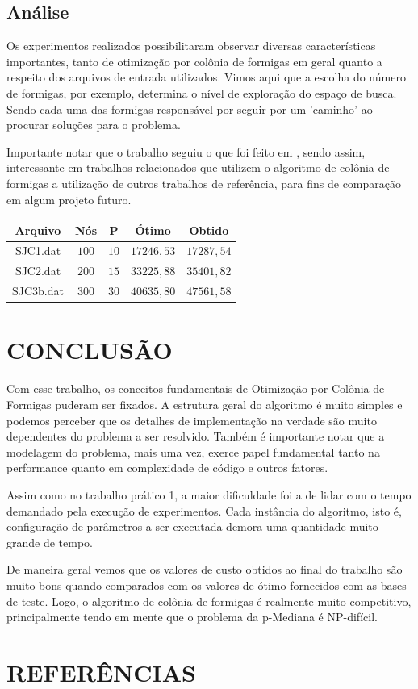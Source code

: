 \documentclass[12pt]{article}
\begin{document}
\subsection{Análise}

Os experimentos realizados possibilitaram observar diversas características importantes, tanto
de otimização por colônia de formigas em geral quanto a respeito dos arquivos de entrada utilizados.
Vimos aqui que a escolha do número de formigas, por exemplo, determina o nível de exploração
do espaço de busca. Sendo cada uma das formigas responsável por seguir por um 'caminho' ao procurar
soluções para o problema.

Importante notar que o trabalho seguiu o que foi feito em \cite{dblp:fr},
sendo assim, interessante em trabalhos relacionados que utilizem o algoritmo de colônia de formigas a
utilização de outros trabalhos de referência, para fins de comparação em algum projeto futuro.

\begin{center}
 \begin{tabular}{|c|c|c|c|c|} \hline
 Arquivo & Nós & P & Ótimo & Obtido \\ \hline
 SJC1.dat & $ 100 $ & $ 10 $ & $ 17246,53 $ & $ 17287,54 $ \\ \hline
 SJC2.dat & $ 200 $ & $ 15 $ & $ 33225,88 $ & $ 35401,82 $ \\ \hline
 SJC3b.dat & $ 300 $ & $ 30 $ & $ 40635,80 $ & $ 47561,58 $ \\ \hline
 \end{tabular} 
\end{center}

\section{CONCLUSÃO}

Com esse trabalho, os conceitos fundamentais de Otimização por Colônia de Formigas puderam ser
fixados. A estrutura geral do algoritmo é muito simples e podemos perceber que os detalhes de
implementação na verdade são muito dependentes do problema a ser resolvido. Também é importante
notar que a modelagem do problema, mais uma vez, exerce papel fundamental tanto na performance
quanto em complexidade de código e outros fatores.

Assim como no trabalho prático 1, a maior dificuldade foi a de lidar com o tempo demandado pela
execução de experimentos. Cada instância do algoritmo, isto é, configuração de parâmetros a ser
executada demora uma quantidade muito grande de tempo.

De maneira geral vemos que os valores de custo obtidos ao final do trabalho são muito bons quando
comparados com os valores de ótimo fornecidos com as bases de teste. Logo, o algoritmo de colônia 
de formigas é realmente muito competitivo, principalmente tendo em mente que o problema da 
p-Mediana é NP-difícil.

\section{REFERÊNCIAS}



\end{document}
